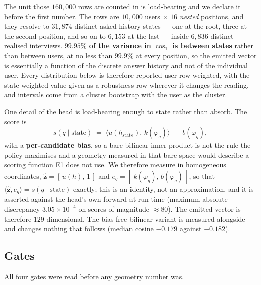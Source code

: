 \documentclass[11pt]{article}
\newcommand{\zz}{\mathbf{z}}
\newcommand{\zhat}{\hat{\zz}}
\begin{document}
The unit those $160{,}000$ rows are counted in is load-bearing and we declare it before the first
number. The rows are $10{,}000$ users $\times$ $16$ \emph{nested} positions, and they resolve to
$31{,}874$ distinct asked-history states --- one at the root, three at the second position, and so on
to $6{,}153$ at the last --- inside $6{,}836$ distinct realised interviews. \textbf{$99.95\%$ of the
variance in $\cos_1$ is between states} rather than between users, at no less than $99.9\%$ at every
position, so the emitted vector is essentially a function of the discrete answer history and not of
the individual user. Every distribution below is therefore reported user-row-weighted, with the
state-weighted value given as a robustness row wherever it changes the reading, and intervals come
from a cluster bootstrap with the user as the cluster.

One detail of the head is load-bearing enough to state rather than absorb. The score is
\begin{equation*}
s(q \mid \text{state}) \;=\; \langle u(h_{\text{state}}),\, k(\varphi_q)\rangle \;+\; b(\varphi_q),
\end{equation*}
with a \textbf{per-candidate bias}, so a bare bilinear inner product is not the rule the policy
maximises and a geometry measured in that bare space would describe a scoring function E1 does not
use. We therefore measure in homogeneous coordinates, $\zhat = [\,u(h),\,1\,]$ and $e_q =
[\,k(\varphi_q),\,b(\varphi_q)\,]$, so that $\langle \zhat, e_q\rangle = s(q\mid\text{state})$
exactly; this is an identity, not an approximation, and it is asserted against the head's own forward
at run time (maximum absolute discrepancy $3.05\times10^{-4}$ on scores of magnitude $\approx 80$).
The emitted vector is therefore $129$-dimensional. The bias-free bilinear variant is measured
alongside and changes nothing that follows (median cosine $-0.179$ against $-0.182$).

\subsection{Gates}

All four gates were read before any geometry number was.
\end{document}
